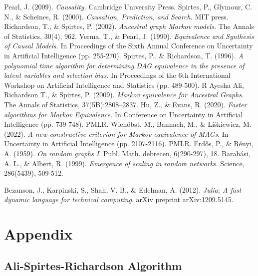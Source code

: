 \documentclass[a4paper]{article}
\begin{document}
\begin{thebibliography}{}
	 Pearl, J. (2009). \textit{Causality.} Cambridge University Press.
	 Spirtes, P., Glymour, C. N., \& Scheines, R. (2000). \textit{Causation, Prediction, and Search.} MIT press.
	 Richardson, T., \& Spirtes, P. (2002). \textit{Ancestral graph Markov models.} The Annals of Statistics, 30(4), 962.
	 Verma, T., \& Pearl, J. (1990). \textit{Equivalence and Synthesis of Causal Models.} In Proceedings of the Sixth Annual Conference on Uncertainty in Artificial Intelligence (pp. 255-270).
	 Spirtes, P., \& Richardson, T. (1996). \textit{A polynomial time algorithm for determining DAG equivalence in the presence of latent variables and selection bias.} In Proceedings of the 6th International Workshop on Artificial Intelligence and Statistics (pp. 489-500).
	R Ayesha Ali, Richardson T., \& Spirtes, P. (2009). \textit{Markov equivalence for Ancestral Graphs.} The Annals of Statistics, 37(5B):2808–2837.
	 Hu, Z., \& Evans, R. (2020). \textit{Faster algorithms for Markov Equivalence.} In Conference on Uncertainty in Artificial Intelligence (pp. 739-748). PMLR.
	 Wienöbst, M., Bannach, M., \& Liśkiewicz, M. (2022). \textit{A new constructive criterion for Markov equivalence of MAGs}. In Uncertainty in Artificial Intelligence (pp. 2107-2116). PMLR.
	 Erd\H{o}s, P., \& R\'{e}nyi, A. (1959). \textit{On random graphs I}. Publ. Math. debrecen, 6(290-297), 18.
	 Barabási, A. L., \& Albert, R. (1999). \textit{Emergence of scaling in random networks}. Science, 286(5439), 509-512.
	
	 Bezanson, J., Karpinski, S., Shah, V. B., \& Edelman, A. (2012). \textit{Julia: A fast dynamic language for technical computing}. arXiv preprint arXiv:1209.5145.
\end{thebibliography}

\newpage

\appendix

\section{Appendix}

\subsection{Ali-Spirtes-Richardson Algorithm}
\end{document}
